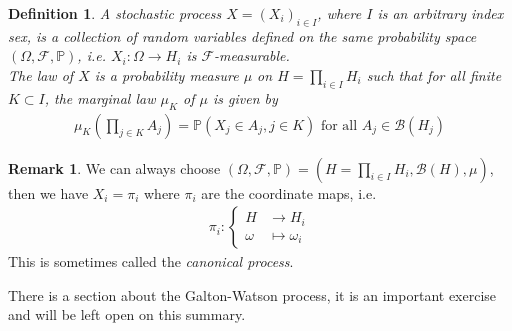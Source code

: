 \documentclass[11pt,a4paper, final]{article}
\newtheorem{defn}{Definition}[section]
\theoremstyle{definition}
\newtheorem{rem}{Remark}[section]
\begin{document}
\begin{defn} A stochastic process $X=(X_i)_{i \in I}$,  where $I$ is an arbitrary index sex, is a collection of random variables defined on the same probability space $( \Omega, \mathcal{F}, \mathbb{P})$, i.e. $X_i : \Omega \to H_i$ is $\mathcal{F}$-measurable. \\ The law of $X$ is a probability measure $ \mu$ on $H= \prod_{i \in I} H_i$ such that for all finite $K \subset I$, the marginal law $\mu_K$ of $\mu$ is given by  
\begin{align*}
\mu_K \left( \prod_{j \in K} A_j \right) = \mathbb{P}( X_j \in A_j, j \in K) \text{ for all } A_j \in \mathcal{B}(H_j) 
\end{align*}
\end{defn}
\begin{rem} We can always choose $( \Omega, \mathcal{F}, \mathbb{P}) = ( H = \prod_{i \in I} H_i, \mathcal{B}(H), \mu)$, then we have $X_i = \pi_i$ where $\pi_i$ are the coordinate maps, i.e.
\begin{align*}
\pi_i : \begin{cases} H & \longrightarrow H_i \\ \omega & \longmapsto \omega_i  \end{cases}
\end{align*}
This is sometimes called the \textit{canonical process}. 
\end{rem}
There is a section about the Galton-Watson process, it is an important exercise and will be left open on this summary. 
\newpage 
\end{document}
